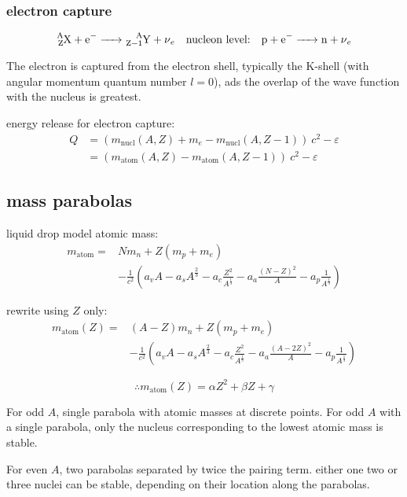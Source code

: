 \documentclass[10pt, a4paper, twocolumn]{article}
\begin{document}
\subsubsection{electron capture}

\[\ce{_Z^AX +e^- -> _{Z-1}^AY +\nu _e}
\qq{nucleon level:}
\ce{p + e^- -> n + \nu _e} \]

The electron is captured from the electron shell, typically the K-shell (with angular momentum quantum number $l=0$), ads the overlap of the wave function with the nucleus is greatest.

energy release for electron capture:
\begin{equation*}
\begin{aligned}
Q&=(m_\text{nucl}(A,Z)
+m_e -m_\text{nucl}(A,Z-1))\ c^2-\varepsilon
\\&=(m_\text{atom}(A,Z)
-m_\text{atom}(A,Z-1))\ c^2-\varepsilon
\end{aligned}
\end{equation*}

\subsection{mass parabolas}
liquid drop model atomic mass:
\begin{equation*}
\begin{split}
m_\text{atom} = &Nm_n+Z(m_p+m_e)
\\ &-\frac{1}{c^2}
\left(
a_vA-a_sA^{\frac23}-a_c\frac{Z^2}{A^{\frac13}}
-a_a\frac{(N-Z)^2}{A}
-a_p\frac{1}{A^{\frac13}}
\right)
\end{split}
\end{equation*}

rewrite using $Z$ only:
\begin{equation*}
\begin{split}
m_\text{atom}(Z) = &(A-Z)m_n+Z(m_p+m_e)
\\ &-\frac{1}{c^2}
\left(
a_vA-a_sA^{\frac23}-a_c\frac{Z^2}{A^{\frac13}}
-a_a\frac{(A-2Z)^2}{A}
-a_p\frac{1}{A^{\frac13}}
\right)
\end{split}
\end{equation*}

\[\therefore
m_\text{atom}(Z)=\alpha Z^2+\beta Z+\gamma\]

For odd $A$, single parabola with atomic masses at discrete points. For odd $A$ with a single parabola, only the nucleus corresponding to the lowest atomic mass is stable. 

For even $A$, two parabolas separated by twice the pairing term. either one two or three nuclei can be stable, depending on their location along the parabolas.
\end{document}
